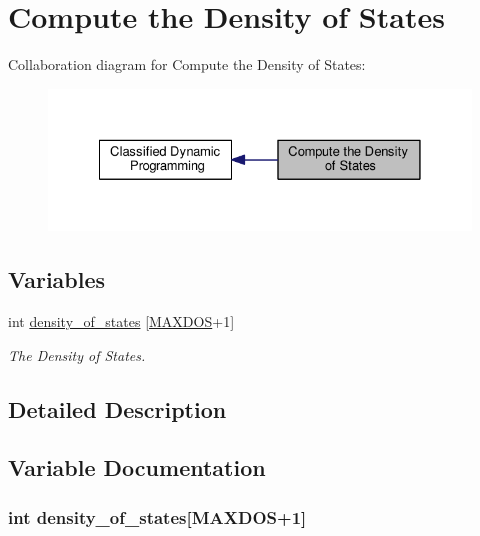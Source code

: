 \hypertarget{group__dos}{\section{Compute the Density of States}
\label{group__dos}
}
Collaboration diagram for Compute the Density of States\-:
\nopagebreak
\begin{figure}[H]
\begin{center}
\leavevmode
\includegraphics[width=328pt]{group__dos}
\end{center}
\end{figure}
\subsection*{Variables}
\begin{DoxyCompactItemize}
\item 
int \hyperlink{group__dos_ga937634a76b46a22530a74906f1957a9e}{density\-\_\-of\-\_\-states} \mbox{[}\hyperlink{subopt_8h_a5ec740b80afb4906ba4311dbd8ddbd89}{M\-A\-X\-D\-O\-S}+1\mbox{]}
\begin{DoxyCompactList}\small\item\em The Density of States. \end{DoxyCompactList}\end{DoxyCompactItemize}


\subsection{Detailed Description}


\subsection{Variable Documentation}
\hypertarget{group__dos_ga937634a76b46a22530a74906f1957a9e}{
\subsubsection[{density\-\_\-of\-\_\-states}]{\setlength{\rightskip}{0pt plus 5cm}int density\-\_\-of\-\_\-states\mbox{[}{\bf M\-A\-X\-D\-O\-S}+1\mbox{]}}}\label{group__dos_ga937634a76b46a22530a74906f1957a9e}


